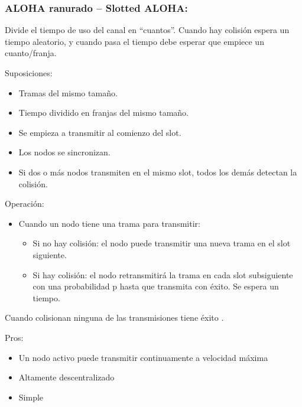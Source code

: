 \documentclass[12pt, twoside, openright]{report} %
\begin{document}
\subsubsection{ALOHA ranurado -- Slotted ALOHA:}

        
        
          Divide el tiempo de uso del canal en ``cuantos''. Cuando hay
          colisión espera un tiempo aleatorio, y cuando pasa el tiempo
          debe esperar que empiece un cuanto/franja.

          Suposiciones:

          \begin{itemize}
          \item
            Tramas del mismo tamaño.
          \item
            Tiempo dividido en franjas del mismo tamaño.
          \item
            Se empieza a transmitir al comienzo del slot.
          \item
            Los nodos se sincronizan.
          \item
            Si dos o más nodos transmiten en el mismo slot, todos los
            demás detectan la colisión.
          \end{itemize}

          Operación:

          \begin{itemize}
          \item
            Cuando un nodo tiene una trama para transmitir:

            \begin{itemize}
              \item
              Si no hay colisión: el nodo puede transmitir una nueva
              trama en el slot siguiente.
            \item
              Si hay colisión: el nodo retransmitirá la trama en cada
              slot subsiguiente con una probabilidad p hasta que
              transmita con éxito. Se espera un tiempo.
            \end{itemize}
          \end{itemize}

          Cuando colisionan ninguna de las transmisiones tiene éxito .

          Pros:

          \begin{itemize}
          \item
            Un nodo activo puede transmitir continuamente a velocidad
            máxima
          \item
            Altamente descentralizado
          \item
            Simple
          \end{itemize}
\end{document}
